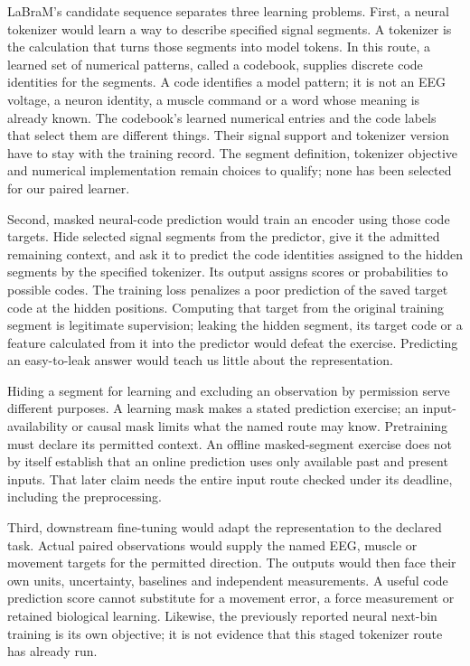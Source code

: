 LaBraM's candidate sequence separates three learning problems. First, a neural
tokenizer would learn a way to describe specified signal segments. A tokenizer
is the calculation that turns those segments into model tokens. In this route,
a learned set of numerical patterns, called a codebook, supplies discrete
code identities for the segments. A code identifies a model pattern; it is not
an EEG voltage, a neuron identity, a muscle command or a word whose meaning is
already known. The codebook's learned numerical entries and the code labels
that select them are different things. Their signal support and tokenizer
version have to stay with the training record. The segment definition,
tokenizer objective and numerical implementation remain choices to qualify;
none has been selected for our paired learner.

Second, masked neural-code prediction would train an encoder using those code
targets. Hide selected signal segments from the predictor, give it the admitted
remaining context, and ask it to predict the code identities assigned to the
hidden segments by the specified tokenizer. Its output assigns scores or
probabilities to possible codes. The training loss penalizes a poor prediction
of the saved target code at the hidden positions. Computing that target from
the original training segment is legitimate supervision; leaking the hidden
segment, its target code or a feature calculated from it into the predictor
would defeat the exercise. Predicting an easy-to-leak answer would teach us
little about the representation.

Hiding a segment for learning and excluding an observation by permission serve
different purposes. A learning mask makes a stated prediction exercise; an
input-availability or causal mask limits what the named route may know.
Pretraining must declare its permitted context. An offline masked-segment
exercise does not by itself establish that an online prediction uses only
available past and present inputs. That later claim needs the entire input
route checked under its deadline, including the preprocessing.

Third, downstream fine-tuning would adapt the representation to the declared
task. Actual paired observations would supply the named EEG, muscle or movement
targets for the permitted direction. The outputs would then face their own
units, uncertainty, baselines and independent measurements. A useful code
prediction score cannot substitute for a movement error, a force measurement
or retained biological learning. Likewise, the previously reported neural
next-bin training is its own objective; it is not evidence that this staged
tokenizer route has already run.

